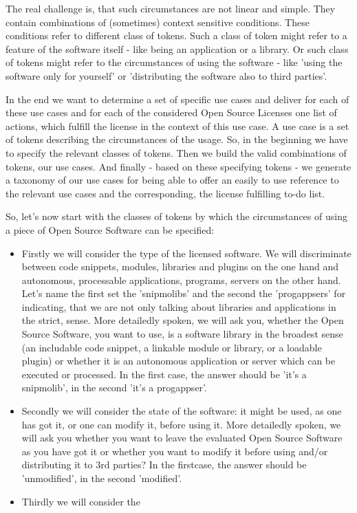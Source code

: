 The real challenge is, that such circumstances are not linear and simple. They
contain combinations of (sometimes) context sensitive conditions. These
conditions refer to different class of tokens. Such a class of token might refer
to a feature of the software itself - like being an application or a library. Or
such class of tokens might refer to the circumstances of using the software -
like 'using the software only for yourself' or 'distributing the software also
to third parties'.

In the end we want to determine a set of specific use cases and deliver for each
of these use cases and for each of the considered Open Source Licenses one list
of actions, which fulfill the license in the context of this use case. A use
case is a set of tokens describing the circumstances of the usage. So, in the
beginning we have to specify the relevant classes of tokens. Then we build the
valid combinations of tokens, our use cases. And finally - based on these
specifying tokens - we generate a taxonomy of our use cases for being able to
offer an easily to use reference to the relevant use cases and the
corresponding, the license fulfilling to-do list. 

So, let's now start with the classes of tokens by which the circumstances of
using a piece of Open Source Software can be specified:

\begin{itemize}
  \item Firstly we will consider the type of the licensed software. We will
  discriminate between code snippets, modules, libraries and plugins on the one
  hand and autonomous, processable applications, programs, servers on the other
  hand. Let's name the first set the 'snipmolibs' and the second the
  'progappsers' for indicating, that we are not only talking about libraries and
  applications in the strict, sense. More detailedly spoken, we will ask you,
  whether the Open Source Software, you want to use, is a software library in
  the broadest sense (an includable code snippet, a linkable module or library,
  or a loadable plugin) or whether it is an autonomous application or server
  which can be executed or processed. In the first case, the answer should be
  'it's a snipmolib', in the second 'it's a progappser'.
  \item Secondly we will consider the state of the software: it might be used,
  as one has got it, or one can modify it, before using it. More detailedly
  spoken, we will ask you whether you want to leave the evaluated Open Source
  Software as you have got it or whether you want to modify it before using
  and/or distributing it to 3rd parties? In the firstcase, the answer should be
  'unmodified', in the second 'modified'.
  \item Thirdly we will consider the 
\end{itemize}




